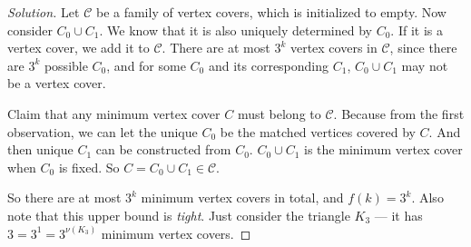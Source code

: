 \begin{proof}[Solution]
        Let $\mathcal{C}$ be a family of vertex covers, which is initialized to empty. Now consider $C_0 \cup C_1$. We know that it is also uniquely determined by $C_0$. If it is a vertex cover, we add it to $\mathcal{C}$. There are at most $3^k$ vertex covers in $\mathcal{C}$, since there are $3^k$ possible $C_0$, and for some $C_0$ and its corresponding $C_1$, $C_0 \cup C_1$ may not be a vertex cover.
        
        Claim that any minimum vertex cover $C$ must belong to $\mathcal{C}$. Because from the first observation, we can let the unique $C_0$ be the matched vertices covered by $C$. And then unique $C_1$ can be constructed from $C_0$. $C_0 \cup C_1$ is the minimum vertex cover when $C_0$ is fixed. So $C = C_0 \cup C_1 \in \mathcal{C}$.
        
        So there are at most $3^k$ minimum vertex covers in total, and $f(k) = 3^k$. Also note that this upper bound is {\it tight}. Just consider the triangle $K_3$ --- it has $3 = 3^1 = 3^{\nu(K_3)}$ minimum vertex covers.
    \end{proof}




